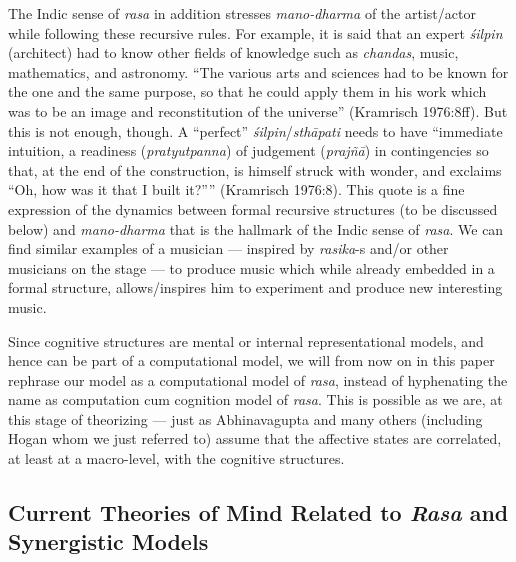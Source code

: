 The Indic sense of \textsl{rasa} in addition stresses \textsl{mano-dharma} of the artist/actor while following these recursive rules. For example, it is said that an expert \textsl{śilpin} (architect) had to know other fields of knowledge such as \textsl{chandas}, music, mathematics, and astronomy. “The various arts and sciences had to be known for the one and the same purpose, so that he could apply them in his work which was to be an image and reconstitution of the universe” (Kramrisch 1976:8ff). But this is not enough, though. A “perfect” \textsl{śilpin}/\textsl{sthāpati} needs to have “immediate intuition, a readiness (\textsl{pratyutpanna}) of judgement (\textsl{prajñā}) in contingencies so that, at the end of the construction, is himself struck with wonder, and exclaims “Oh, how was it that I built it?”” (Kramrisch 1976:8). This quote is a fine expression of the dynamics between formal recursive structures (to be discussed below) and \textsl{mano-dharma} that is the hallmark of the Indic sense of \textsl{rasa}. We can find similar examples of a musician --- inspired by \textsl{rasika}-s and/or other musicians on the stage --- to produce music which while  already embedded in a formal structure, allows/inspires him to experiment and produce new interesting music.

Since cognitive structures are mental or internal representational models, and hence can be part of a computational model, we will from now on in this paper rephrase our model as a computational model of \textsl{rasa}, instead of hyphenating the name as computation cum cognition model of \textsl{rasa}. This is possible as we are, at this stage of theorizing --- just as Abhinavagupta and many others (including Hogan whom we just referred to) assume that the affective states are correlated, at least at a macro-level, with the cognitive structures.\\[-20pt]

\subsection{Current Theories of Mind Related to \textsl{Rasa} and Synergistic Models}\label{chap3-sec3.1}

